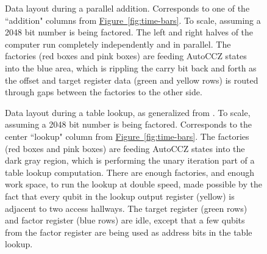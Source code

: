 \documentclass[a4paper, onecolumn, accepted=2021-03-29]{quantumarticle}
\newcommand{\fig}[1]{\hyperref[fig:#1]{Figure~\ref*{fig:#1}}}
\begin{document}
\begin{figure}[p]
    \begin{center}
    \end{center}
    \caption{
        Data layout during a parallel addition.
        Corresponds to one of the ``addition" columns from \fig{time-bars}.
        To scale, assuming a 2048 bit number is being factored.
        The left and right halves of the computer run completely independently and in parallel.
        The factories (red boxes and pink boxes) are feeding AutoCCZ states into the blue area, which is rippling the carry bit back and forth as the offset and target register data (green and yellow rows) is routed through gaps between the factories to the other side.
    }
    \label{fig:addition-layout-2d}
\end{figure}

\begin{figure}[p]
    \begin{center}
    \end{center}
    \caption{
        Data layout during a table lookup, as generalized from \cite{gidney2019autoccz}.
        To scale, assuming a 2048 bit number is being factored.
        Corresponds to the center ``lookup" column from \fig{time-bars}.
        The factories (red boxes and pink boxes) are feeding AutoCCZ states into the dark gray region, which is performing the unary iteration part of a table lookup computation.
        There are enough factories, and enough work space, to run the lookup at double speed, made possible by the fact that every qubit in the lookup output register (yellow) is adjacent to two access hallways.
        The target register (green rows) and factor register (blue rows) are idle, except that a few qubits from the factor register are being used as address bits in the table lookup.
    }
    \label{fig:lookup-layout}
\end{figure}
\end{document}
